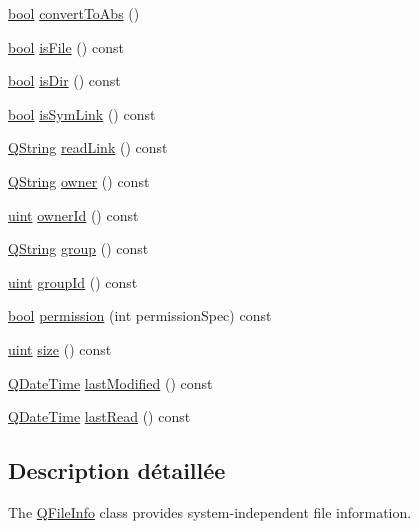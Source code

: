 \begin{DoxyCompactItemize}
\item 
\hyperlink{qglobal_8h_a1062901a7428fdd9c7f180f5e01ea056}{bool} \hyperlink{class_q_file_info_a3a4b0328b3fd423e0cfb0747445760b8}{convert\+To\+Abs} ()
\item 
\hyperlink{qglobal_8h_a1062901a7428fdd9c7f180f5e01ea056}{bool} \hyperlink{class_q_file_info_aede7d40196ddb197e303518f76f04fa3}{is\+File} () const 
\item 
\hyperlink{qglobal_8h_a1062901a7428fdd9c7f180f5e01ea056}{bool} \hyperlink{class_q_file_info_a93aecba4bcd72253d925e6028e8756f8}{is\+Dir} () const 
\item 
\hyperlink{qglobal_8h_a1062901a7428fdd9c7f180f5e01ea056}{bool} \hyperlink{class_q_file_info_a5c902fd9a150a1479a9fa6155aba9136}{is\+Sym\+Link} () const 
\item 
\hyperlink{class_q_string}{Q\+String} \hyperlink{class_q_file_info_a8d871b8ef2390811b5bf0546394173d2}{read\+Link} () const 
\item 
\hyperlink{class_q_string}{Q\+String} \hyperlink{class_q_file_info_a1f295bc64cd357225f9c9fd6185b55d3}{owner} () const 
\item 
\hyperlink{qglobal_8h_a4d3943ddea65db7163a58e6c7e8df95a}{uint} \hyperlink{class_q_file_info_a09d4e3b703ba0f98b3c83e8d44d2acc9}{owner\+Id} () const 
\item 
\hyperlink{class_q_string}{Q\+String} \hyperlink{class_q_file_info_a47564fd62e9b11a39a2521cd0c085505}{group} () const 
\item 
\hyperlink{qglobal_8h_a4d3943ddea65db7163a58e6c7e8df95a}{uint} \hyperlink{class_q_file_info_ab907c9a7bc4e8990107cc832f3979963}{group\+Id} () const 
\item 
\hyperlink{qglobal_8h_a1062901a7428fdd9c7f180f5e01ea056}{bool} \hyperlink{class_q_file_info_a4c3fe59a5d16f62320645d617259ccb7}{permission} (int permission\+Spec) const 
\item 
\hyperlink{qglobal_8h_a4d3943ddea65db7163a58e6c7e8df95a}{uint} \hyperlink{class_q_file_info_a0828a6759b013f6d05a5579ba60c21d4}{size} () const 
\item 
\hyperlink{class_q_date_time}{Q\+Date\+Time} \hyperlink{class_q_file_info_a849c009637765455d956a43871cf57ee}{last\+Modified} () const 
\item 
\hyperlink{class_q_date_time}{Q\+Date\+Time} \hyperlink{class_q_file_info_a76ff81425f8249238925960b4a6d670b}{last\+Read} () const 
\end{DoxyCompactItemize}


\subsection{Description détaillée}
The \hyperlink{class_q_file_info}{Q\+File\+Info} class provides system-\/independent file information. 

